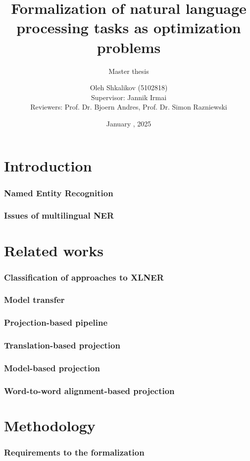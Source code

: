 \documentclass{beamer}
\title[XLNER]{Formalization of natural language processing tasks as optimization problems}
\subtitle{Master thesis}
\author[Oleh Shkalikov]{Oleh Shkalikov\texorpdfstring{ (5102818)
    \\[0.7em]{\small Supervisor: Jannik Irmai}
\\{\small Reviewers: Prof. Dr. Bjoern Andres, Prof. Dr. Simon Razniewski}}{}}
\institute[TU Dresden]{TU Dresden}
\date{January , 2025}
\begin{document}
\frame{\titlepage}


\section{Introduction}

\begin{frame}
  \frametitle{Named Entity Recognition}

\end{frame}

\begin{frame}
  \frametitle{Issues of multilingual NER}
\end{frame}

\section{Related works}

\begin{frame}
  \frametitle{Classification of approaches to XLNER}
\end{frame}

\begin{frame}
  \frametitle{Model transfer}
\end{frame}

\begin{frame}
  \frametitle{Projection-based pipeline}
\end{frame}

\begin{frame}
  \frametitle{Translation-based projection}
\end{frame}

\begin{frame}
  \frametitle{Model-based projection}
\end{frame}

\begin{frame}
  \frametitle{Word-to-word alignment-based projection}
\end{frame}

\section{Methodology}

\begin{frame}
  \frametitle{Requirements to the formalization}
\end{frame}
\end{document}
